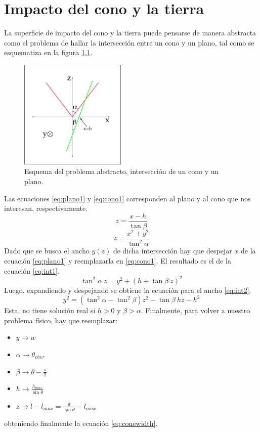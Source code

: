 \chapter{Impacto del cono \cher{} y la tierra}
\label{ap:intPlanCon}

	La superficie de impacto del cono \cher{} y la tierra puede pensarse de manera abstracta como el problema de hallar la intersección entre un cono y un plano, tal como se esquematiza en la figura \ref{fig:conoInt}.
	\begin{figure}[ht!]
		\centering
		\includegraphics[width=0.45\textwidth]{./fig/appendix/conoInt}
		\caption{\label{fig:conoInt}
		Esquema del problema abstracto, intersección de un cono y un plano.
		}
	\end{figure}
	Las ecuaciones \ref{eq:plano1} y \ref{eq:cono1} corresponden al plano y al cono que nos interesan, respectivamente.
	\begin{equation}
	z=\frac{x-h}{\tan \beta}
	\label{eq:plano1}
	\end{equation}
	\begin{equation}
	z=\frac{x^2+y^2}{\tan^2 \alpha}
	\label{eq:cono1}
	\end{equation}
	Dado que se busca el ancho $y(z)$ de dicha intersección hay que despejar $x$ de la ecuación \ref{eq:plano1} y reemplazarla en \ref{eq:cono1}. 
	El resultado es el de la ecuación \ref{eq:int1}.
	\begin{equation}
	\tan^2\alpha\ z=y^2+(h+\tan \beta\ z)^2
	\label{eq:int1}
	\end{equation}
	Luego, expandiendo y despejando se obtiene la ecuación para el ancho \ref{eq:int2}. 
	\begin{equation}
	y^2=(\tan^2 \alpha-\tan^2 \beta) z^2 - \tan\beta\ h z - h^2
	\label{eq:int2}
	\end{equation}
	Esta, no tiene solución real si $h>0$ y $\beta>\alpha$.
	Finalmente, para volver a nuestro problema físico, hay que reemplazar:
	\begin{itemize}
	\item $y \rightarrow w$
	 \item $\alpha \rightarrow \theta_{cher}$
	 \item $\beta \rightarrow \theta - \frac{\pi}{2}$
	 \item $h \rightarrow \frac{h_{max}}{\sin{\theta}}$
	 \item $z \rightarrow l-l_{max} = \frac{d}{\sin \theta} -l_{max}$
	\end{itemize}
	obteniendo finalmente la ecuación \ref{eq:conewidth}.
